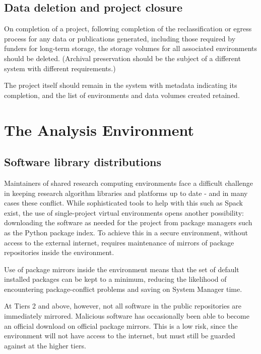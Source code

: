 \documentclass[10pt,a4paper,twocolumn]{article}
\begin{document}
\subsection{Data deletion and project closure}

On completion of a project, following completion of the reclassification or egress process for any
data or publications generated, including those required by funders for long-term
storage, the storage volumes for all associated environments should be deleted. (Archival preservation should
be the subject of a different system with different requirements.)

The project itself should remain in the system with metadata indicating its completion, and the list of
environments and data volumes created retained.

\section{The Analysis Environment}
\label{sec:environment}

\subsection{Software library distributions}
\label{mirrors}

Maintainers of shared research computing environments face a difficult challenge in keeping research algorithm libraries and platforms
up to date - and in many cases these conflict. While sophisticated tools to help with this such as Spack~\cite{spack} exist,
the use of single-project virtual environments opens another possibility: downloading the software as needed for the project
from package managers such as the Python package index. To achieve this in a secure environment, without access to the
external internet, requires maintenance of mirrors of package repositories inside the environment.

Use of package mirrors inside the environment means that the set of default installed packages can be kept
to a minimum, reducing the likelihood of encountering package-conflict problems and saving on
System Manager time.

At Tiers 2 and above, however, not  all software in the public repositories are immediately mirrored.
Malicious software has occasionally been able to become an official download on official package mirrors. 
This is a low risk, since the environment will not have access to the internet, but must still be guarded against at the higher tiers.
\end{document}
